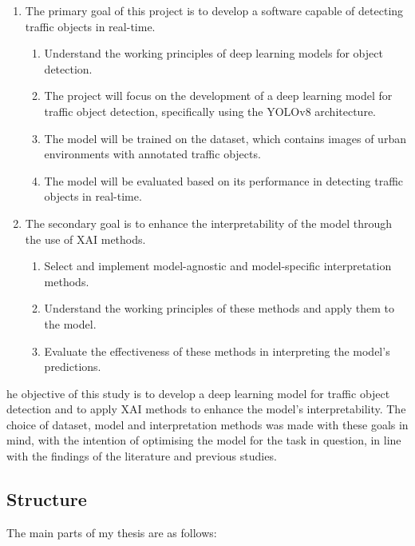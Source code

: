 \begin{enumerate}
    \item The primary goal of this project is to develop a software capable of detecting traffic objects in real-time.
    \begin{enumerate}
        \item Understand the working principles of deep learning models for object detection.
        \item The project will focus on the development of a deep learning model for traffic object detection, specifically using the YOLOv8 architecture.
        \item The model will be trained on the  dataset, which contains images of urban environments with annotated traffic objects.
        \item The model will be evaluated based on its performance in detecting traffic objects in real-time.
    \end{enumerate}
    \item The secondary goal is to enhance the interpretability of the model through the use of XAI methods.
    \begin{enumerate}
        \item Select and implement model-agnostic and model-specific interpretation methods.
        \item Understand the working principles of these methods and apply them to the model.
        \item Evaluate the effectiveness of these methods in interpreting the model's predictions.
    \end{enumerate}
\end{enumerate}
he objective of this study is to develop a deep learning model for traffic object detection and to apply XAI methods to enhance the model's interpretability.
The choice of dataset, model and interpretation methods was made with these goals in mind, with the intention of optimising the model for the task in question, in line with the findings of the literature and previous studies.
\subsection{Structure}\label{subsec:Structure} %

The main parts of my thesis are as follows:

